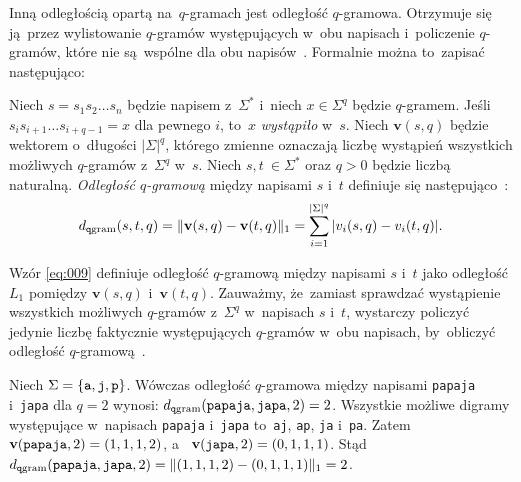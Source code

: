 \documentclass{praca1}
\DeclarePairedDelimiter{\norm}{\lVert}{\rVert}
\begin{document}

Inną odległością opartą na~$q$-gramach jest odległość $q$-gramowa. Otrzymuje się ją~przez wylistowanie $q$-gramów występujących w~obu napisach i~policzenie $q$-gramów, które nie są~wspólne dla obu napisów~\cite{Loo2014:stringdist}. Formalnie można to~zapisać następująco:

\begin{definition}
Niech $s = s_1 s_2 \ldots s_n$ będzie napisem z~$\Sigma^*$ i~niech $x \in \Sigma^q$ będzie $q$-gramem. Jeśli $s_i s_{i+1} \ldots s_{i+q-1} = x$ dla pewnego $i$, to~$x$ \emph{wystąpiło} w~$s$. Niech $\mathbf{v}(s,q)$ będzie wektorem o~długości $|\Sigma|^q$, którego zmienne oznaczają liczbę wystąpień wszystkich możliwych $q$-gramów z~$\Sigma^q$ w~$s$. Niech $s, t~\in \Sigma^*$ oraz $q>0$ będzie liczbą naturalną. \emph{Odległość $q$-gramową} między napisami $s$ i~$t$ definiuje się następująco~\cite{Ukkonen1992:approxqgrams}:
\begin{equation}
\label{eq:009}
d_{\mathtt{q}\mathrm{gram}}(s,t,q) = \norm{\mathbf{v}(s,q) - \mathbf{v}(t,q)}_1 = \sum\limits_{i = 1}^{|\Sigma|^q} |v_i(s,q) - v_i(t,q)|.
\end{equation}
\end{definition} 

Wzór \eqref{eq:009} definiuje odległość $q$-gramową między napisami $s$ i~$t$ jako odległość $L_1$ pomiędzy $\mathbf{v}(s,q)$ i~$\mathbf{v}(t,q)$. Zauważmy, że~zamiast sprawdzać wystąpienie wszystkich możliwych $q$-gramów z~$\Sigma^q$ w~napisach $s$ i~$t$, wystarczy policzyć jedynie liczbę faktycznie występujących $q$-gramów w~obu napisach, by~obliczyć odległość $q$-gramową~\cite{Loo2014:stringdist}.

\begin{example}
\label{ex:001}
Niech $\Sigma = \{\verb|a|, \verb|j|, \verb|p|\}$. Wówczas odległość $q$-gramowa między napisami \verb|papaja| i~\verb|japa| dla $q = 2$ wynosi: $d_{\mathtt{q}\mathrm{gram}}(\verb|papaja|, \verb|japa|, 2) = 2$. Wszystkie możliwe digramy występujące w~napisach  \verb|papaja| i~\verb|japa| to~\verb|aj|, \verb|ap|, \verb|ja| i~\verb|pa|. Zatem $\mathbf{v}( \verb|papaja|,2) = (1, 1, 1, 2)$, a~ $\mathbf{v}( \verb|japa|,2) = (0, 1, 1, 1)$. Stąd $d_{\mathtt{q}\mathrm{gram}}(\verb|papaja|, \verb|japa|, 2) =  \norm{(1,1,1,2) - (0,1,1,1)}_1 = 2$.
\end{example}
\end{document}
